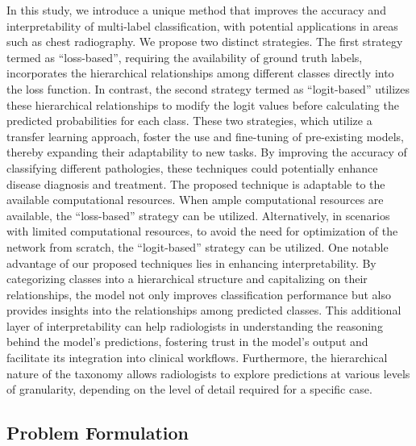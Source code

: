 \documentclass[review,1p,times,numbers]{elsarticle}
\begin{document}
In this study, we introduce a unique method that improves the accuracy and interpretability of multi-label classification, with potential applications in areas such as chest radiography. We propose two distinct strategies. The first strategy termed as ``loss-based'', requiring the availability of ground truth labels, incorporates the hierarchical relationships among different classes directly into the loss function. In contrast, the second strategy termed as ``logit-based'' utilizes these hierarchical relationships to modify the logit values before calculating the predicted probabilities for each class. These two strategies, which utilize a transfer learning approach, foster the use and fine-tuning of pre-existing models, thereby expanding their adaptability to new tasks. By improving the accuracy of classifying different pathologies, these techniques could potentially enhance disease diagnosis and treatment.
The proposed technique is adaptable to the available computational resources. When ample computational resources are available, the ``loss-based'' strategy can be utilized. Alternatively, in scenarios with limited computational resources, to avoid the need for optimization of the network from scratch, the ``logit-based'' strategy can be utilized.
One notable advantage of our proposed techniques lies in enhancing interpretability. By categorizing classes into a hierarchical structure and capitalizing on their relationships, the model not only improves classification performance but also provides insights into the relationships among predicted classes.
This additional layer of interpretability can help radiologists in understanding the reasoning behind the model's predictions, fostering trust in the model's output and facilitate its integration into clinical workflows. Furthermore, the hierarchical nature of the taxonomy allows radiologists to explore predictions at various levels of granularity, depending on the level of detail required for a specific case.

\subsection{Problem Formulation}\label{subsec:taxonomy.problem_formulation}
\end{document}
